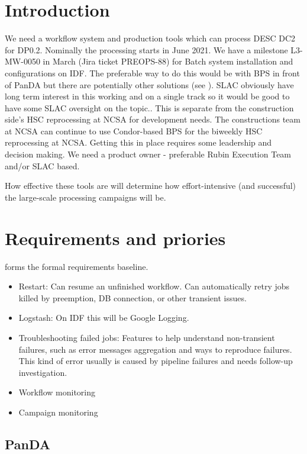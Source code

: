 \section{Introduction}

We need a workflow system and production tools which can process DESC DC2 for DP0.2. Nominally the processing starts in June 2021.
We have a milestone L3-MW-0050 in March (Jira ticket PREOPS-88) for Batch system installation and configurations on IDF.
The preferable way to do this would be with BPS in front of PanDA but there are potentially other solutions (see ).
SLAC obviously have long term interest in this working and on a single track so it would be good to have some SLAC oversight on the topic..
This is separate from the construction side's HSC reprocessing at NCSA for development needs. The  constructions team at NCSA can continue to use Condor-based BPS for the biweekly HSC reprocessing at NCSA.
Getting this in place requires some leadership and decision making. We need a product owner - preferable Rubin Execution Team and/or SLAC based.

How effective these tools are will determine how effort-intensive (and
successful) the large-scale processing campaigns will be.

\section {Requirements and priories}
 forms the formal requirements baseline.

\begin{itemize}
\item Restart: Can resume an unfinished workflow. Can automatically retry jobs killed by preemption, DB connection, or other transient issues.
\item Logstash: On IDF this will be Google Logging.
\item Troubleshooting failed jobs: Features to help understand non-transient failures, such as error messages aggregation and ways to reproduce failures. This kind of error usually is caused by pipeline failures and needs follow-up investigation.
\item Workflow monitoring
\item Campaign monitoring
\end{itemize}

\subsection{PanDA}

